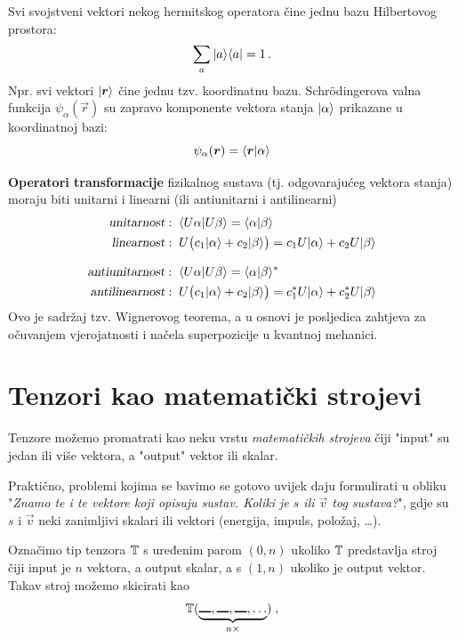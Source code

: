 Svi svojstveni vektori nekog hermitskog operatora čine jednu bazu
Hilbertovog prostora:
\begin{displaymath}
             \sum_{a} | a \rangle\langle a | = 1 \,.
\end{displaymath}
Npr. svi vektori $\ket{\vec{r}}$ čine jednu tzv. koordinatnu bazu.
Schr\"{o}dingerova valna funkcija $\psi_{\alpha}(\vec{r})$ su zapravo
komponente vektora stanja $| \alpha \rangle$ prikazane u koordinatnoj
bazi:
\begin{displaymath}
            \psi_{\alpha}(\vec{r})=\bra{\vec{r}}\alpha\rangle
\end{displaymath}


\textbf{Operatori transformacije} fizikalnog sustava (tj. odgovarajućeg vektora
stanja) moraju biti unitarni i linearni (ili antiunitarni i antilinearni)
\begin{align*}
\text{\sl unitarnost}&:\; \langle U\alpha |U\beta\rangle = \langle \alpha |\beta\rangle
   \\
\text{\sl linearnost}&:\; U\big(c_1| \alpha \rangle+c_{2}| \beta \rangle\big)=
  c_1 U| \alpha \rangle + c_{2} U| \beta \rangle
   \\[2ex]
\text{\sl antiunitarnost}&:\; \langle U\alpha |U\beta\rangle = \langle \alpha |\beta\rangle^*
  \\
\text{\sl antilinearnost}&:\; U\big(c_1| \alpha \rangle+c_{2}| \beta \rangle\big)=
  c_{1}^* U| \alpha \rangle + c_{2}^* U| \beta \rangle
\end{align*}
Ovo je sadržaj tzv. Wignerovog teorema, a u osnovi
je posljedica zahtjeva za očuvanjem vjerojatnosti i
načela superpozicije u kvantnoj mehanici.

\chapter{Tenzori kao matematički strojevi}
\label{sec:tenzorKaoStroj}

Tenzore možemo promatrati kao neku vrstu \emph{matematičkih strojeva}
\cite{MTW:2017}
čiji "input" su jedan ili više vektora, a "output" vektor ili
skalar. 

Praktično, problemi kojima se bavimo se gotovo uvijek daju formulirati
u obliku "\emph{Znamo te i te vektore koji opisuju sustav. Koliki
je $s$ ili $\vec{v}$ tog sustava?}", gdje su $s$ i $\vec{v}$ neki
zanimljivi skalari ili vektori (energija, impuls, položaj, \dots).

Označimo tip tenzora $\mathbb{T}$ s uređenim parom $(0, n)$ ukoliko 
$\mathbb{T}$ predstavlja stroj čiji input je $n$ vektora, a output skalar,
a s $(1, n)$ ukoliko je output vektor. Takav stroj
možemo skicirati kao
\begin{equation}
   \bbtensor{T}(\underbrace{\slot, \slot, \slot, \dots}_{n \times})  \;,
\end{equation}


